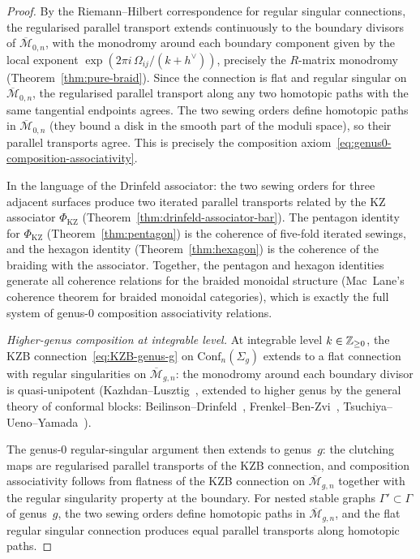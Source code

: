 \begin{proof}
By the Riemann--Hilbert correspondence for regular singular
connections, the regularised parallel transport extends
continuously to the boundary divisors of
$\overline{\mathcal{M}}_{0,n}$, with the monodromy around
each boundary component given by the local exponent
$\exp(2\pi i\, \Omega_{ij}/(k+h^\vee))$, precisely the
$R$-matrix monodromy
\textup{(}Theorem~\textup{\ref{thm:pure-braid}}\textup{)}.
Since the connection is flat and regular singular on
$\overline{\mathcal{M}}_{0,n}$, the regularised parallel
transport along any two homotopic paths with the same
tangential endpoints agrees. The two sewing orders define
homotopic paths in $\overline{\mathcal{M}}_{0,n}$
\textup{(}they bound a disk in the smooth part of the
moduli space\textup{)}, so their parallel transports agree.
This is precisely the composition
axiom~\eqref{eq:genus0-composition-associativity}.

In the language of the Drinfeld associator: the two sewing
orders for three adjacent surfaces produce two iterated
parallel transports related by the KZ associator
$\Phi_{\mathrm{KZ}}$
\textup{(}Theorem~\textup{\ref{thm:drinfeld-associator-bar}}\textup{)}.
The pentagon identity for $\Phi_{\mathrm{KZ}}$
\textup{(}Theorem~\textup{\ref{thm:pentagon}}\textup{)}
is the coherence of five-fold iterated sewings, and
the hexagon identity
\textup{(}Theorem~\textup{\ref{thm:hexagon}}\textup{)}
is the coherence of the braiding with the associator. Together,
the pentagon and hexagon identities generate all coherence
relations for the braided monoidal structure
\textup{(}Mac~Lane's coherence theorem for braided monoidal
categories\textup{)}, which is exactly the full system of
genus-$0$ composition associativity relations.

\medskip\noindent
\emph{Higher-genus composition at integrable level.}
At integrable level $k \in \mathbb{Z}_{\ge 0}$, the KZB
connection~\eqref{eq:KZB-genus-g} on
$\mathrm{Conf}_n(\Sigma_g)$ extends to a flat connection with
regular singularities on $\overline{\mathcal{M}}_{g,n}$: the
monodromy around each boundary divisor is quasi-unipotent
\textup{(}Kazhdan--Lusztig~\cite{KL93}, extended to higher genus
by the general theory of conformal blocks:
Beilinson--Drinfeld~\cite{BD04}, Frenkel--Ben-Zvi~\cite{FBZ04},
Tsuchiya--Ueno--Yamada~\cite{TUY89}\textup{)}.

The genus-$0$ regular-singular argument then extends to genus~$g$:
the clutching maps are regularised parallel transports of the
KZB connection, and composition associativity follows from
flatness of the KZB connection on
$\overline{\mathcal{M}}_{g,n}$ together with the regular
singularity property at the boundary. For nested stable graphs
$\Gamma' \subset \Gamma$ of genus~$g$, the two sewing orders
define homotopic paths in $\overline{\mathcal{M}}_{g,n}$,
and the flat regular singular connection produces equal
parallel transports along homotopic paths.


\end{proof}
